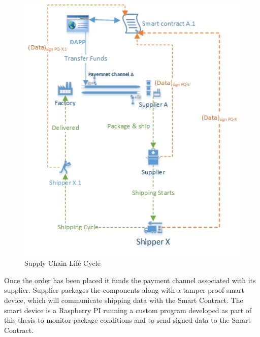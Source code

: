 \begin{figure}[h]
	\centering
    \includegraphics[width=140mm,scale=1]{figs/monitoring_subdiag}
	\caption{Supply Chain Life Cycle}
	\label{fig:monitoring_subdiag} 
\end{figure}

Once the order has been placed it funds the payment channel associated with its supplier. Supplier packages the components along with a tamper proof smart device, which will communicate shipping data with the Smart Contract. The smart device is a Raspberry PI running a custom program developed as part of this thesis to monitor package conditions and to send signed data to the Smart Contract. 

